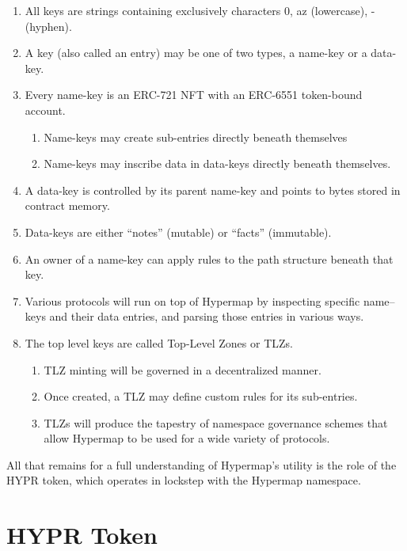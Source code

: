 \documentclass[runningheads]{llncs}
\begin{document}
\begin{enumerate}
    \item All keys are strings containing exclusively characters 0, a\textendash z (lowercase),    - (hyphen).
    \item A key (also called an entry) may be one of two types, a name-key or a data-key.
    \item Every name-key is an ERC-721 NFT with an ERC-6551 token-bound account.
        \begin{enumerate}
            \item Name-keys may create sub-entries directly beneath themselves
            \item Name-keys may inscribe data in data-keys directly beneath themselves.
        \end{enumerate}
    \item A data-key is controlled by its parent name-key and points to bytes stored in contract memory.
    \item Data-keys are either ``notes'' (mutable) or ``facts'' (immutable).
    \item An owner of a name-key can apply rules to the path structure beneath that key.
    \item Various protocols will run on top of Hypermap by inspecting specific name–keys and their data entries, and parsing those entries in various ways.
    \item The top level keys are called Top-Level Zones or TLZs.
        \begin{enumerate}
            \item TLZ minting will be governed in a decentralized manner.
            \item Once created, a TLZ may define custom rules for its sub-entries.
            \item TLZs will produce the tapestry of namespace governance schemes that allow Hypermap to be used for a wide variety of protocols.
        \end{enumerate}
\end{enumerate}

All that remains for a full understanding of Hypermap's utility is the role of the HYPR token, which operates in lockstep with the Hypermap namespace.

\section{HYPR Token}
\label{sec:hypr}
\end{document}
